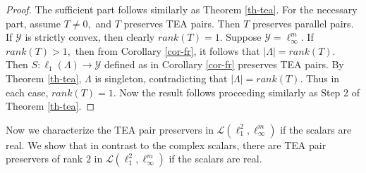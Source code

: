 \documentclass{amsart}
\theoremstyle{definition}
\theoremstyle{remark}
\numberwithin{equation}{section}
\begin{document}
\begin{proof}
	The sufficient part follows similarly as Theorem \ref{th-tea}. For the necessary part, assume $T\neq 0,$ and $T$ preserves TEA pairs. Then $T$ preserves parallel pairs. If $\mathcal{Y}$ is strictly convex, then clearly $rank(T)=1.$ Suppose $\mathcal{Y}=\ell_\infty^m.$  If $rank(T)> 1,$ then from Corollary \ref{cor-fr}, it follows that $|\Lambda|=rank(T).$ Then $S:\ell_1(\Lambda)\to \mathcal{Y}$ defined as  in Corollary \ref{cor-fr} preserves TEA pairs. By Theorem \ref{th-tea}, $\Lambda$ is singleton, contradicting that $|\Lambda|=rank(T).$ Thus in each case, $rank(T)=1.$ Now the result follows proceeding similarly as Step 2 of Theorem \ref{th-tea}.
\end{proof}
	
	Now we characterize the TEA pair preservers in $\mathcal{L}(\ell_1^2,\ell_\infty^m)$ if the scalars are real.  We show that in contrast to the complex scalars, there are TEA pair preservers of  rank $2$  in $\mathcal{L}(\ell_1^2,\ell_\infty^m)$ if the scalars are real.
	
\end{document}
